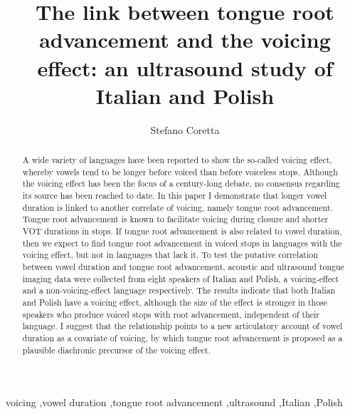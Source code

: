 \documentclass[authoryear, 5p]{elsarticle}
\date{}
\begin{document}
\begin{frontmatter}

\title{The link between tongue root advancement and the voicing effect: an ultrasound study of Italian and Polish}

\author[mcr]{Stefano Coretta}
\address[mcr]{University of Manchester, Linguistics and English Language}

\begin{abstract}

A wide variety of languages have been reported to show the so-called voicing effect, whereby vowels tend to be longer before voiced than before voiceless stops.
Although the voicing effect has been the focus of a century-long debate, no consensus regarding its source has been reached to date.
In this paper I demonstrate that longer vowel duration is linked to another correlate of voicing, namely tongue root advancement.
Tongue root advancement is known to facilitate voicing during closure and shorter VOT durations in stops.
If tongue root advancement is also related to vowel duration, then we expect to find tongue root advancement in voiced stops in languages with the voicing effect, but not in languages that lack it.
To test the putative correlation between vowel duration and tongue root advancement, acoustic and ultrasound tongue imaging data were collected from eight speakers of Italian and Polish, a voicing-effect and a non-voicing-effect language respectively.
The results indicate that both Italian and Polish have a voicing effect, although the size of the effect is stronger in those speakers who produce voiced stops with root advancement, independent of their language.
I suggest that the relationship points to a new articulatory account of vowel duration as a covariate of voicing, by which tongue root advancement is proposed as a plausible diachronic precursor of the voicing effect.




\end{abstract}

\begin{keyword}
voicing \sep vowel duration \sep tongue root advancement \sep ultrasound \sep Italian \sep Polish
\end{keyword}

\end{frontmatter}
\end{document}
